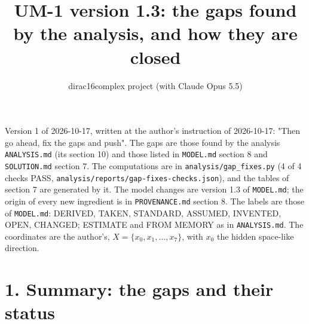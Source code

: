 \documentclass[11pt]{article}
\title{UM-1 version 1.3: the gaps found by the analysis, and how they are closed}
\author{dirac16complex project (with Claude Opus 5.5)}
\date{}
\begin{document}
\maketitle
\tableofcontents
\newpage

Version 1 of 2026-10-17, written at the author's instruction of 2026-10-17: "Then go ahead, fix the gaps and push". The gaps are those found by the analysis \texttt{ANALYSIS.\allowbreak{}md} (its section 10) and those listed in \texttt{MODEL.\allowbreak{}md} section 8 and \texttt{SOLUTION.\allowbreak{}md} section 7. The computations are in \texttt{analysis/\allowbreak{}gap\_\allowbreak{}fixes.\allowbreak{}py} (4 of 4 checks PASS, \texttt{analysis/\allowbreak{}reports/\allowbreak{}gap-{}\allowbreak{}fixes-{}\allowbreak{}checks.\allowbreak{}json}), and the tables of section 7 are generated by it. The model changes are version 1.3 of \texttt{MODEL.\allowbreak{}md}; the origin of every new ingredient is in \texttt{PROVENANCE.\allowbreak{}md} section 8. The labels are those of \texttt{MODEL.\allowbreak{}md}: DERIVED, TAKEN, STANDARD, ASSUMED, INVENTED, OPEN, CHANGED; ESTIMATE and FROM MEMORY as in \texttt{ANALYSIS.\allowbreak{}md}. The coordinates are the author's, $X = \{x_0, x_1, \dots, x_7\}$, with $x_0$ the hidden space-like direction.

\section*{1. Summary: the gaps and their status}
\end{document}
